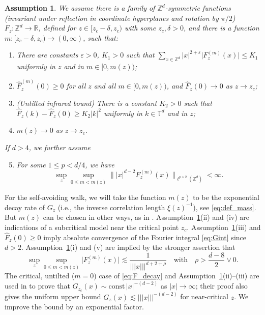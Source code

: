 \documentclass[11pt,hidelinks]{article}
\theoremstyle{plain}
\newtheorem{assumption}[theorem]{Assumption}
\numberwithin{equation}{section}
\newcommand{\ie}{i.e.}
\newcommand{\eps}{\varepsilon}
\newcommand{\Z}{\mathbb{Z}}
\newcommand{\R}{\mathbb{R}}
\newcommand{\T}{\mathbb{T}}
\newcommand{\inv}{^{-1}}
\renewcommand{\(}{\left(}
\renewcommand{\)}{\right)}
\newcommand{\1}{\mathds{1}}
\providecommand{\abs}[1]{\lvert#1\rvert}
\providecommand{\bignorm}[1]{\big\lVert#1\big\rVert}
\newcommand{\mz}{m(z)}
\newcommand{\supm}{^{(m)}}
\newcommand{\veee}[1]{|\!|\!|#1|\!|\!|}
\providecommand{\nnnorm}[1]{\veee {#1} }
\newcommand{\const}{\mathrm{const}}
\newcommand{\crit}{_{z_c}}
\begin{document}
\begin{assumption}
\label{ass:Fz}
We assume there is a family of $\Z^d$-symmetric functions 
(invariant under reflection in coordinate hyperplanes and rotation by $\pi/2$)
$F_z : \Z^d \to \R$, 
defined for $z \in [z_c - \delta, z_c)$ with some $z_c, \delta >0$, 
and there is a function $m: [z_c - \delta, z_c ) \to (0, \infty)$, 
such that:
\begin{enumerate}[label=(\roman*)]

\item 
There are constants $\eps > 0$, $K_1 > 0$ such that $\sum_{x\in \Z^d} \abs x^{2+\eps} \abs{ F_z\supm (x) } \le K_1$ uniformly in $z$ and in $m \in [0, \mz)$;

\item
$\hat F_z\supm (0) \ge 0$ for all $z$ and all $m \in [0, \mz)$,
and $\hat F_z(0) \to 0$ as $z\to z_c$;

\item \emph{(Untilted infrared bound)}
There is a constant $K_2 >0$ such that
$\hat F_z(k) - \hat F_z(0) \ge K_2 \abs k^2$ uniformly in $k\in \T^d$ and in $z$;

\item 
$\mz \to 0$ as $z\to z_c$.
\end{enumerate}
If $d > 4$, we further assume 
\begin{enumerate}[label=(\roman*)] \setcounter{enumi}{4}
\item
For some $1 \le p < d/4$, we have
\[
\sup_z \sup_{0\le m < \mz}
\bignorm{ \abs x^{d-2} F_z\supm (x) }_{\ell^{p\wedge 2}(\Z^d)} < \infty .
\]
\end{enumerate}
\end{assumption}

For the self-avoiding walk, we will take the function $\mz$ to be the exponential decay rate of $G_z$ (\ie, the inverse correlation length $\xi(z)\inv$), see \eqref{eq:def_mass}.
But $\mz$ can be chosen in other ways, as in \cite[Section~1.3]{LS25a}.
Assumption~\ref{ass:Fz}(ii) and (iv) are indications of a subcritical model near the critical point $z_c$. 
Assumption~\ref{ass:Fz}(iii) and $\hat F_z(0) \ge 0$ imply absolute convergence of the Fourier integral \eqref{eq:Gint} since $d>2$. 
Assumption~\ref{ass:Fz}(i) and (v) are implied by the stronger assertion that
\begin{equation} \label{eq:F_decay}
\sup_z \sup_{0\le m < \mz}
\abs{ F_z\supm (x) } \lesssim \frac 1 { \nnnorm x^{d + 2 + \rho} }
\quad \text{with}\quad 
\rho > \frac { d-8 } 2 \vee 0 .
\end{equation}
The critical, untilted ($m=0$) case of \eqref{eq:F_decay} and Assumption~\ref{ass:Fz}(ii)--(iii) are used in \cite{LS24a} to prove that $G\crit(x) \sim \const\, \abs x^{-(d-2)}$ as $\abs x\to \infty$;
their proof also gives the uniform upper bound $G_z (x) \lesssim \nnnorm x^{-(d-2)}$ for near-critical $z$. 
We improve the bound by an exponential factor. 
\end{document}

